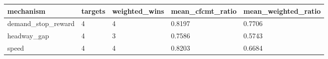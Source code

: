 \begin{tabular}{lllll}
\toprule
mechanism & targets & weighted\_wins & mean\_cfcmt\_ratio & mean\_weighted\_ratio \\
\midrule
demand\_stop\_reward & 4 & 4 & 0.8197 & 0.7706 \\
headway\_gap & 4 & 3 & 0.7586 & 0.5743 \\
speed & 4 & 4 & 0.8203 & 0.6684 \\
\bottomrule
\end{tabular}
